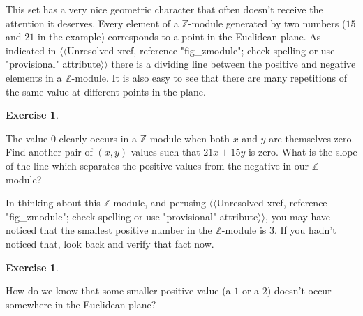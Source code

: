 \documentclass[10pt,]{book}
\theoremstyle{plain}
\theoremstyle{definition}
\theoremstyle{definition}
\newtheorem{exercise}[theorem]{Exercise}
\numberwithin{equation}{section}
\newcommand{\Integers}{{\mathbb Z}}
\begin{document}
    This set has a very nice geometric character that often doesn't receive the
    attention it deserves. Every element of a \(\Integers\)-module generated
    by two numbers (\(15\) and \(21\) in the example)
    corresponds to a point in the Euclidean plane. As indicated in
    {$\langle\langle$Unresolved xref, reference "fig\_zmodule"; check spelling or use "provisional" attribute$\rangle\rangle$} there is a dividing line between the positive
    and negative elements in a \(\Integers\)-module. It is also easy to see
    that there are many repetitions of the same value at different points
    in the plane.
\begin{exercise}\label{exercise-28}

        The value \(0\) clearly occurs in a \(\Integers\)-module when both
        \(x\) and \(y\) are themselves zero. Find another pair of \((x,y)\)
        values such that \(21x+15y\) is zero. What is the slope of
        the line which separates the positive values from the negative
        in our \(\Integers\)-module?
\end{exercise}
\par

    In thinking about this \(\Integers\)-module, and perusing
    {$\langle\langle$Unresolved xref, reference "fig\_zmodule"; check spelling or use "provisional" attribute$\rangle\rangle$}, you may have noticed that the smallest
    positive number in the \(\Integers\)-module is 3. If you hadn't
    noticed that, look back and verify that fact now.
\begin{exercise}\label{exercise-29}

        How do we know that some smaller positive value (a \(1\) or a \(2\)) doesn't
        occur somewhere in the Euclidean plane?
\end{exercise}
\par
\end{document}
